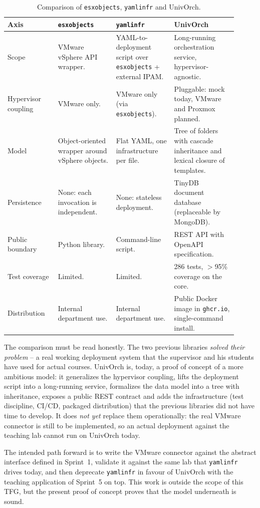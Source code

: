 \begin{table}[ht]
  \centering
  \small
  \begin{tabular}{p{0.20\linewidth} p{0.23\linewidth} p{0.23\linewidth} p{0.25\linewidth}}
    \toprule
    \textbf{Axis} & \textbf{\texttt{esxobjects}} & \textbf{\texttt{yamlinfr}} & \textbf{UnivOrch} \\
    \midrule
    Scope &
    VMware vSphere API wrapper. &
    YAML-to-deployment script over \texttt{esxobjects} + external
    IPAM. &
    Long-running orchestration service, hypervisor-agnostic. \\
    Hypervisor coupling &
    VMware only. &
    VMware only (via \texttt{esxobjects}). &
    Pluggable: mock today, VMware and Proxmox planned. \\
    Model &
    Object-oriented wrapper around vSphere objects. &
    Flat YAML, one infrastructure per file. &
    Tree of folders with cascade inheritance and lexical closure of
    templates. \\
    Persistence &
    None: each invocation is independent. &
    None: stateless deployment. &
    TinyDB document database (replaceable by MongoDB). \\
    Public boundary &
    Python library. &
    Command-line script. &
    REST API with OpenAPI specification. \\
    Test coverage &
    Limited. &
    Limited. &
    286 tests, $>$95\% coverage on the core. \\
    Distribution &
    Internal department use. &
    Internal department use. &
    Public Docker image in \texttt{ghcr.io}, single-command install. \\
    \bottomrule
  \end{tabular}
  \caption{Comparison of \texttt{esxobjects}, \texttt{yamlinfr} and
    UnivOrch.}
  \label{tab:comparison}
\end{table}

The comparison must be read honestly. The two previous libraries
\emph{solved their problem} -- a real working deployment system
that the supervisor and his students have used for actual courses.
UnivOrch is, today, a proof of concept of a more ambitious model:
it generalizes the hypervisor coupling, lifts the deployment script
into a long-running service, formalizes the data model into a tree
with inheritance, exposes a public REST contract and adds the
infrastructure (test discipline, CI/CD, packaged distribution) that
the previous libraries did not have time to develop. It does \emph{not
yet} replace them operationally: the real VMware connector is still
to be implemented, so an actual deployment against the teaching lab
cannot run on UnivOrch today.

The intended path forward is to write the VMware connector against
the abstract interface defined in Sprint~1, validate it against the
same lab that \texttt{yamlinfr} drives today, and then deprecate
\texttt{yamlinfr} in favour of UnivOrch with the teaching
application of Sprint~5 on top. This work is outside the scope of
this TFG, but the present proof of concept proves that the model
underneath is sound.
